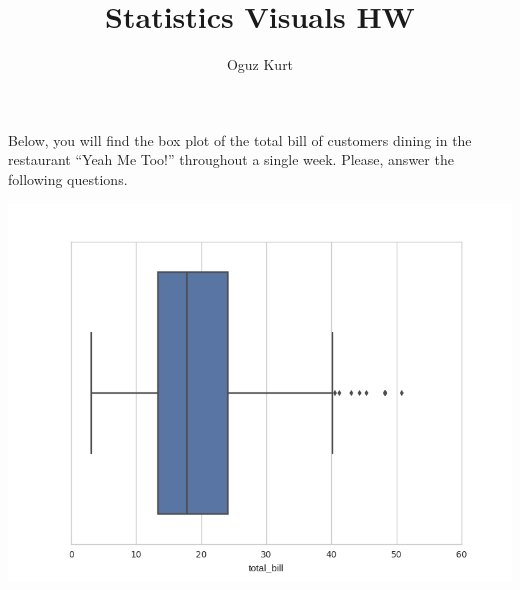 \documentclass{ximera}
\title{Statistics Visuals HW}
\author{Oguz Kurt}
\begin{document}
\begin{abstract}
\empty
\end{abstract}
\maketitle


\begin{problem} Below, you will find the box plot of the total bill of customers dining in the restaurant ``Yeah Me Too!'' throughout a single week. Please, answer the following questions.

\begin{image}
    \includegraphics[width=15cm]{../img/hbplot.png}
\end{image}


\end{problem}
\end{document}
